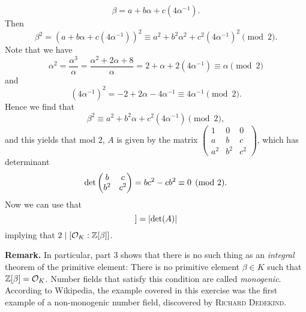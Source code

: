 \documentclass[a4paper,11pt]{article}
\begin{document}
\begin{enumerate}[labelindent=0pt, wide]
        \begin{equation*}
            \beta = a + b \alpha + c (4\alpha^{-1}).
        \end{equation*}
        Then $$\beta^2 = (a + b \alpha + c (4\alpha^{-1}))^2
        \equiv a^2 + b^2 \alpha^2 + c^2 (4\alpha^{-1})^2 \pmod 2.$$
        Note that we have 
        \begin{equation*}
            \alpha^2 = \frac {\alpha^3}\alpha = \frac{\alpha^2 + 2\alpha + 8}
            \alpha = 2 + \alpha + 2 (4 \alpha^{-1}) \equiv \alpha \pmod 2
        \end{equation*}
        and 
        \begin{equation*}
            (4 \alpha^{-1})^2 = -2 + 2\alpha - 4 \alpha^{-1} \equiv 4\alpha^{-1}
            \pmod 2.
        \end{equation*}
        Hence we find that 
        \begin{equation*}
            \beta^2 \equiv a^2 + b^2 \alpha + c^2 (4 \alpha^{-1}) \pmod 2,
        \end{equation*}
        and this yields that mod $2$, $A$ is given by the matrix
        $\left( \begin{smallmatrix}
        1 & 0 & 0 \\
        a & b & c \\
        a^2 & b^2 & c^2 
        \end{smallmatrix}\right)  $, which has determinant
        \begin{equation*}
            \det \begin{pmatrix} b & c\\ b^2 & c^2 \end{pmatrix} = bc^2 - cb^2 \equiv 0 \pmod 2.
        \end{equation*}
        Now we can use that 
        \begin{equation*}
            [\cO_K: \Z[\beta]] = \abs{\det(A)}
        \end{equation*}
        implying that $2 \mid [\mathcal{O}_K: \mathbb{Z}[\beta]]$.


\end{enumerate}

\textbf{Remark.} In particular, part 3 shows that there is no such thing as an
\emph{integral} theorem of the primitive element: There is no primitive element
$\beta \in K$ such that $\mathbb{Z}[\beta] = \mathcal{O}_K$. Number fields that satisfy this
condition are called \emph{monogenic}. According to Wikipedia, the example covered
in this exercise was the first example of a non-monogenic number field,
discovered by \textsc{Richard Dedekind}.


\contactend
\end{document}
